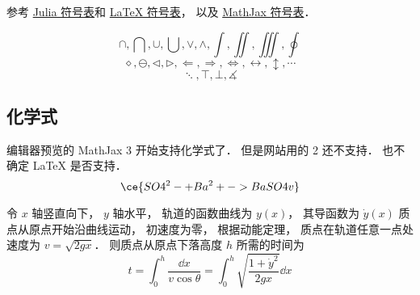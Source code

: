 
参考 \href{https://docs.julialang.org/en/v1/manual/unicode-input/}{Julia 符号表}和 \href{https://oeis.org/wiki/List_of_LaTeX_mathematical_symbols}{LaTeX 符号表}， 以及 \href{http://www.onemathematicalcat.org/MathJaxDocumentation/TeXSyntax.htm#U}{MathJax 符号表}．

\begin{equation}
\cap, \bigcap, \cup, \bigcup, \vee, \wedge, \int, \iint, \iiint, \oint
\end{equation}
\begin{equation}
\diamond, \ominus, \triangleleft, \triangleright, \Longleftarrow, \Longrightarrow, \iff, \leftrightarrow, \updownarrow, \cdots
\end{equation}
\begin{equation}
\ddots, \top, \bot, \measuredangle
\end{equation}

\subsection{化学式}
编辑器预览的 MathJax 3 开始支持化学式了． 但是网站用的 2 还不支持． 也不确定 LaTeX 是否支持．
\begin{equation}
\ce{SO4^2- + Ba^2+ -> BaSO4 v}
\end{equation}

令 $x$ 轴竖直向下， $y$ 轴水平， 轨道的函数曲线为 $y(x)$， 其导函数为 $\dot y(x)$ 质点从原点开始沿曲线运动， 初速度为零， 根据动能定理， 质点在轨道任意一点处速度为 $v = \sqrt{2gx}$． 则质点从原点下落高度 $h$ 所需的时间为
\begin{equation}
t = \int_{0}^{h} \frac{\dd{x}}{v\cos\theta} = \int_{0}^{h} \sqrt{\frac{1 + \dot y^2}{2gx}}\dd{x}
\end{equation}

